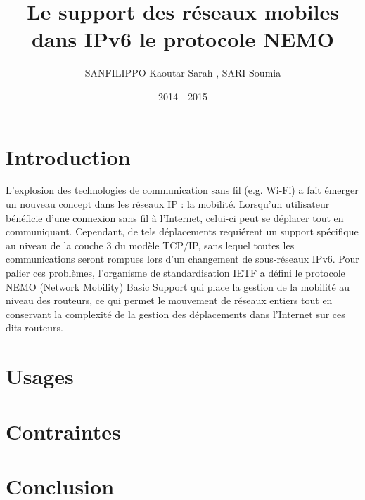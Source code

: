 \documentclass[a4paper]{article}
\title{Le support des r\'{e}seaux mobiles dans IPv6
           le protocole NEMO }
\author{SANFILIPPO Kaoutar Sarah , SARI Soumia}
\date{2014 - 2015}
\begin{document}
\maketitle
\newpage
\renewcommand{\contentsname}{Sommaire}
\tableofcontents


\newpage
\section{Introduction}

{\normalsize L'explosion des technologies de communication sans fil (e.g. Wi-Fi) a fait \'{e}merger un nouveau
concept dans les r\'{e}seaux IP : la mobilit\'{e}. Lorsqu'un utilisateur b\'{e}n\'{e}ficie d'une connexion sans fil \`a
l'Internet, celui-ci peut se d\'{e}placer tout en communiquant. Cependant, de tels d\'{e}placements
requi\'{e}rent un support sp\'{e}cifique au niveau de la couche 3 du mod\`{e}le TCP/IP, sans lequel toutes les
communications seront rompues lors d'un changement de sous-r\'{e}seaux IPv6. Pour palier ces
probl\`{e}mes, l'organisme de standardisation IETF a d\'{e}fini le protocole NEMO (Network Mobility) Basic
Support qui place la gestion de la mobilit\'{e} au niveau des routeurs, ce qui permet le mouvement de
r\'{e}seaux entiers tout en conservant la complexit\'{e} de la gestion des d\'{e}placements dans l'Internet sur
ces dits routeurs.}

\section{Usages}
\section{Contraintes}
\section{Conclusion}
\end{document}

